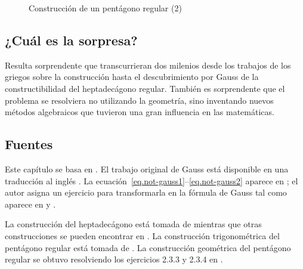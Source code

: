 \begin{figure}[t]
\begin{center}
\end{center}
\caption{Construcción de un pentágono regular (2)}\label{f.hept-pentagon3}
\end{figure}

\subsection*{¿Cuál es la sorpresa?}

Resulta sorprendente que transcurrieran dos milenios desde los trabajos de los griegos sobre la construcción hasta el descubrimiento por Gauss de la constructibilidad del heptadecágono regular. También es sorprendente que el problema se resolviera no utilizando la geometría, sino inventando nuevos métodos algebraicos que tuvieron una gran influencia en las matemáticas.

\subsection*{Fuentes}

Este capítulo se basa en \cite{jorg}. El trabajo original de Gauss está disponible en una traducción al inglés \cite{gauss}.
La ecuación~\ref{eq.not-gauss1}--\ref{eq.not-gauss2} aparece en \cite{rike}; el autor asigna un ejercicio para transformarla en la fórmula de Gauss tal como aparece en \cite[p.~458]{gauss} y \cite[p.~68]{jorg}.

La construcción del heptadecágono está tomada de \cite{callagy} mientras que otras construcciones se pueden encontrar en \cite{wiki:heptadecagon}. La construcción trigonométrica del pentágono regular está tomada de \cite{wiki:pentagon}. La construcción geométrica del pentágono regular se obtuvo resolviendo los ejercicios 2.3.3 y 2.3.4 en \cite{stillwell}.
